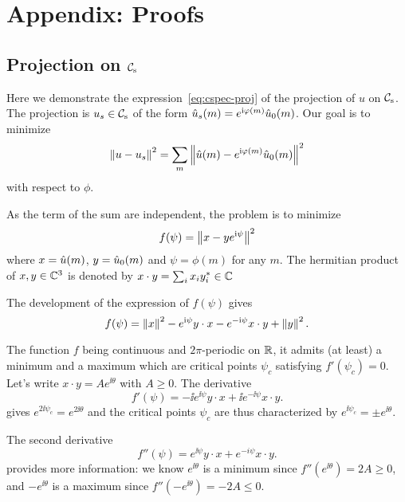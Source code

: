 \appendix
\section{Appendix: Proofs}
\label{sec:app-proofs}


\subsection{Projection on \texorpdfstring{${\mathcal{C}_{\mathrm{s}}}$}{the Spectrum Constraint}}
\label{app:spec-proj}

Here we demonstrate the expression~\eqref{eq:cspec-proj} of the projection of $u$ on ${\mathcal{C}_{\mathrm{s}}}$.
The projection is $u_s\in{\mathcal{C}_{\mathrm{s}}}$ of the form
  $\hat{u}_s(m) = e^{\mathrm{i}\varphi(m)} \hat{u}_0(m)$.
Our goal is to minimize
\begin{equation}
  \left\|u-u_s\right\|^2 = \sum_m \left\|\hat{u}(m) - e^{\mathrm{i}\varphi(m)}\hat{u}_0(m)\right\|^2
\end{equation}
with respect to $\phi$.

As the term of the sum are independent, the problem is to minimize
\begin{equation}
  f(\psi) = \left\|x-ye^{\mathrm{i}\psi}\right\|^2
\end{equation}
where $x=\hat{u}(m)$, $y=\hat{u}_0(m)$ and $\psi=\phi(m)$ for any $m$.
The hermitian product of $x,y \in\mathbb{C}^3$ is denoted by $x\cdot y = \sum_ix_iy_i^* \in\mathbb{C}$

The development of the expression of $f(\psi)$ gives
\begin{equation*}
  f(\psi) = \left\|x\right\|^2 - e^{\mathrm{i}\psi} y\cdot x - e^{-\mathrm{i}\psi} x\cdot y + \left\|y\right\|^2.
\end{equation*}

The function $f$ being continuous and $2\pi$-periodic on $\mathbb{R}$, it admits (at least) a minimum and a maximum which are critical points $\psi_c$ satisfying $f'(\psi_c)=0$.
Let's write $x\cdot y=Ae^{\ii\theta}$ with $A\geq 0$.
The derivative
\begin{equation*}
  f'(\psi) = - \ii e^{\ii\psi} y\cdot x + \ii e^{-\ii\psi} x\cdot y.
\end{equation*}
gives
  $e^{2\ii\psi_c}=e^{2\ii\theta}$
and the critical points $\psi_c$ are thus characterized by
  $e^{\ii\psi_c}=\pm e^{\ii\theta}$.

The second derivative
\begin{equation*}
  f''(\psi) = e^{\ii\psi} y\cdot x +e ^{-i\psi} x\cdot y.
\end{equation*}
provides more information: we know $e^{\ii\theta}$ is a minimum since $f''(e^{\ii\theta})=2A\geq 0$, and $-e^{\ii\theta}$ is a maximum since $f''(-e^{\ii\theta})=-2A\leq 0$.

